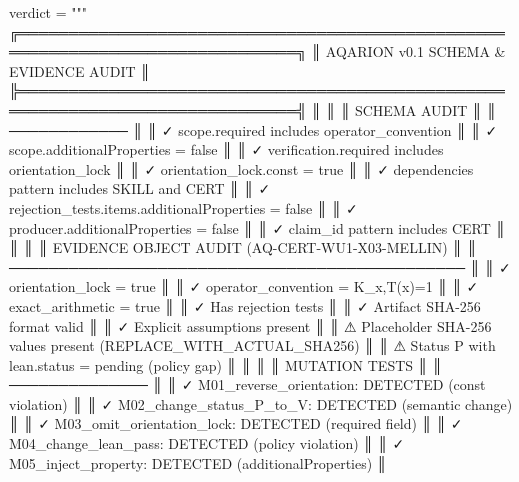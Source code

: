 verdict = """
╔══════════════════════════════════════════════════════════════════════════════╗
║                    AQARION v0.1 SCHEMA & EVIDENCE AUDIT                      ║
╠══════════════════════════════════════════════════════════════════════════════╣
║                                                                              ║
║  SCHEMA AUDIT                                                                ║
║  ────────────                                                                ║
║  ✓ scope.required includes operator_convention                              ║
║  ✓ scope.additionalProperties = false                                       ║
║  ✓ verification.required includes orientation_lock                           ║
║  ✓ orientation_lock.const = true                                          ║
║  ✓ dependencies pattern includes SKILL and CERT                             ║
║  ✓ rejection_tests.items.additionalProperties = false                      ║
║  ✓ producer.additionalProperties = false                                    ║
║  ✓ claim_id pattern includes CERT                                           ║
║                                                                              ║
║  EVIDENCE OBJECT AUDIT (AQ-CERT-WU1-X03-MELLIN)                             ║
║  ──────────────────────────────────────────────                             ║
║  ✓ orientation_lock = true                                                  ║
║  ✓ operator_convention = K_x,T(x)=1                                         ║
║  ✓ exact_arithmetic = true                                                  ║
║  ✓ Has rejection tests                                                      ║
║  ✓ Artifact SHA-256 format valid                                          ║
║  ✓ Explicit assumptions present                                             ║
║  ⚠ Placeholder SHA-256 values present (REPLACE_WITH_ACTUAL_SHA256)        ║
║  ⚠ Status P with lean.status = pending (policy gap)                        ║
║                                                                              ║
║  MUTATION TESTS                                                              ║
║  ──────────────                                                              ║
║  ✓ M01_reverse_orientation: DETECTED (const violation)                      ║
║  ✓ M02_change_status_P_to_V: DETECTED (semantic change)                    ║
║  ✓ M03_omit_orientation_lock: DETECTED (required field)                      ║
║  ✓ M04_change_lean_pass: DETECTED (policy violation)                       ║
║  ✓ M05_inject_property: DETECTED (additionalProperties)                     ║
